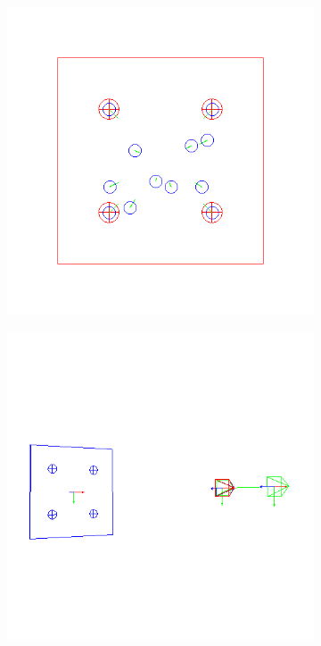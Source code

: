 \begin{figure}[ht!]
\centering
  \centering
  \begin{subfigure}{.48\linewidth}
    \centering
    \includegraphics[width=\linewidth]{figures/plots/ex2pimage.png}
    \caption{}
    \label{fig:ex2cimage}
  \end{subfigure}
  \begin{subfigure}{.48\linewidth}
    \centering
    \includegraphics[width=\linewidth]{figures/plots/ex2pscene.png}

\end{subfigure}
\end{figure}
